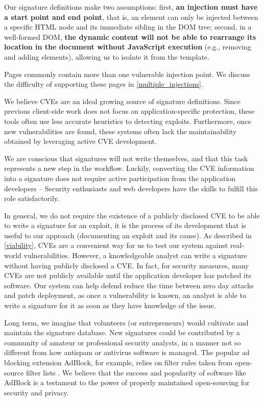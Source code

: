 Our signature definitions make two assumptions: first,
\textbf{an injection must have a start point and end point}, that is,
an element can only be injected between a specific HTML node and its
immediate sibling in the DOM tree; second, in a well-formed DOM,
\textbf{the dynamic content will not be able to rearrange its location
  in the document without JavaScript execution} (e.g., removing and
adding elements), allowing us to isolate it from the template.

Pages commonly contain more than one vulnerable injection point.
We discuss the difficulty of supporting these pages in \autoref{multiple_injections}.

We believe CVEs are an ideal growing source of signature
definitions. Since previous client-side work does not focus on
application-specific protection, these tools often use less accurate
heuristics to detecting exploits. Furthermore, once new
vulnerabilities are found, these systems often lack the
maintainability obtained by leveraging active CVE development.

We are conscious that \sys signatures will not write themselves, and that
this task represents a new step in the workflow. Luckily, converting
the CVE information into a signature does not require active
participation from the application developers -- Security enthusiasts and
web developers have the skills to fulfill this role satisfactorily.

In general, we do not require the existence of a publicly disclosed CVE to be able to write a signature for an exploit, it is the process of its development that is useful to our approach (documenting an exploit and its cause). As described in \autoref{viability}, CVEs are a convenient way for us to test our system against real-world vulnerabilities. However, a knowledgeable analyst can write a signature without having publicly disclosed a CVE. In fact, for security measures, many CVEs are not publicly available until the application developer has patched its software. Our system can help defend reduce the time between zero day attacks and patch deployment, as once a vulnerability is known, an analyst is able to write a signature for it as soon as they have knowledge of the issue.

Long term, we imagine that volunteers (or entrepreneurs) would
cultivate and maintain the signature database. New signatures could be
contributed by a community of amateur or professional security analysts, in a manner not
so different from how antispam or antivirus software is managed. The popular ad blocking
extension AdBlock, for example, relies on filter rules taken from open-source filter lists \cite{adblockhow}. 
We believe that the success and popularity of software like AdBlock is a testament to 
the power of properly maintained open-sourcing for security and privacy.

